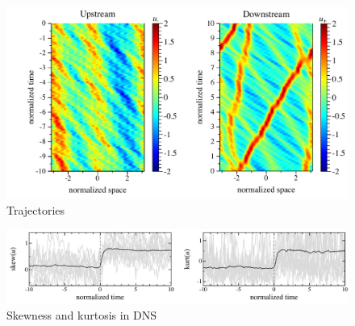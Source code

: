 \documentclass[11pt]{article}
\newcommand{\vsp}[1]{\vspace{#1 pc} \noindent}
\begin{document}
\begin{figure}%
\begin{center}
\includegraphics[width = 0.99 \linewidth]{Figs/trajectories.pdf}
\caption{
Trajectories
}
\label{trajectories}
\end{center}
\end{figure}

\begin{figure}%
\begin{center}
\includegraphics[width = 0.99 \linewidth]{Figs/skew-kurt.pdf}
\caption{
Skewness and kurtosis in DNS}
\label{skew-kurt}
\end{center}
\end{figure}
 
 
\vsp{5}
\end{document}
